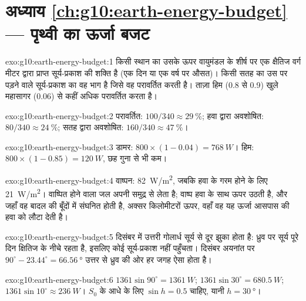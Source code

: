 \section*{अध्याय \ref{ch:g10:earth-energy-budget} --- पृथ्वी का ऊर्जा बजट}

\begin{solution}{exo:g10:earth-energy-budget:1}
किसी स्थान का  उसके ऊपर वायुमंडल के शीर्ष पर एक क्षैतिज वर्ग मीटर द्वारा प्राप्त
सूर्य-प्रकाश की शक्ति है (एक दिन या एक वर्ष पर औसत)। किसी सतह का  उस पर पड़ने
वाले सूर्य-प्रकाश का वह भाग है जिसे वह परावर्तित करती है। ताज़ा हिम (0.8 से 0.9) खुले
महासागर (0.06) से कहीं अधिक परावर्तित करता है।
\end{solution}

\begin{solution}{exo:g10:earth-energy-budget:2}
परावर्तित: $100/340 \approx \qty{29}{\percent}$; हवा द्वारा अवशोषित:
$80/340 \approx \qty{24}{\percent}$; सतह द्वारा अवशोषित: $160/340
\approx \qty{47}{\percent}$।
\end{solution}

\begin{solution}{exo:g10:earth-energy-budget:3}
डामर: $800 \times (1 - 0.04) = \qty{768}{W}$। हिम: $800 \times (1 -
0.85) = \qty{120}{W}$, छह गुना से भी कम।
\end{solution}

\begin{solution}{exo:g10:earth-energy-budget:4}
वाष्पन: \qty{82}{W/m^2}, जबकि हवा के गरम होने के लिए \qty{21}{W/m^2}। वाष्पित होने वाला
जल अपनी  समुद्र से लेता है; वाष्प हवा के साथ ऊपर उठती है, और जहाँ वह बादल
की बूँदों में संघनित होती है, अक्सर किलोमीटरों ऊपर, वहाँ वह यह ऊर्जा आसपास की हवा को लौटा
देती है।
\end{solution}

\begin{solution}{exo:g10:earth-energy-budget:5}
दिसंबर में उत्तरी गोलार्ध सूर्य से दूर झुका होता है: ध्रुव पर सूर्य पूरे दिन क्षितिज के नीचे
रहता है, इसलिए कोई सूर्य-प्रकाश नहीं पहुँचता। दिसंबर अयनांत पर
$90^\circ - 23.44^\circ =
\qty{66.56}{\degree}$ उत्तर से ध्रुव की ओर हर जगह ऐसा होता है।
\end{solution}

\begin{solution}{exo:g10:earth-energy-budget:6}
$1361 \sin 90^\circ = \qty{1361}{W}$; $1361 \sin 30^\circ =
\qty{680.5}{W}$; $1361 \sin 10^\circ \approx \qty{236}{W}$। $S_0$ के आधे के लिए
$\sin h = 0.5$ चाहिए, यानी $h = \qty{30}{\degree}$।
\end{solution}

